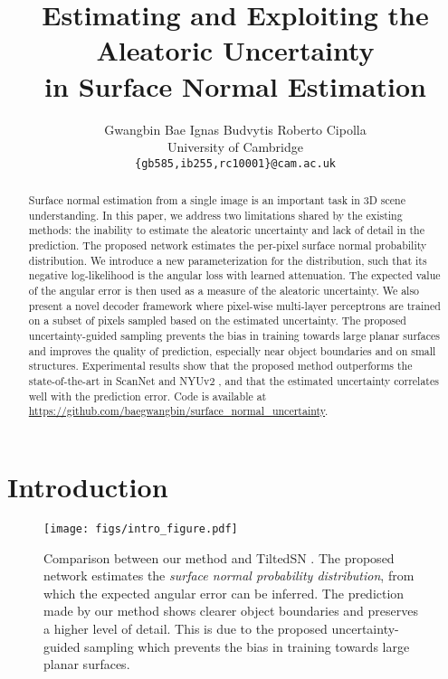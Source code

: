 \documentclass[10pt,twocolumn,letterpaper]{article}
\begin{document}
\title{Estimating and Exploiting the Aleatoric Uncertainty \\ in Surface Normal Estimation}

\author{Gwangbin Bae \;\;\;\; Ignas Budvytis \;\;\;\; Roberto Cipolla\\
University of Cambridge\\
{\tt\small \{gb585,ib255,rc10001\}@cam.ac.uk}
}

\maketitle
\ificcvfinal\thispagestyle{empty}\fi

\begin{abstract}
Surface normal estimation from a single image is an important task in 3D scene understanding. In this paper, we address two limitations shared by the existing methods: the inability to estimate the aleatoric uncertainty and lack of detail in the prediction. The proposed network estimates the per-pixel surface normal probability distribution. We introduce a new parameterization for the distribution, such that its negative log-likelihood is the angular loss with learned attenuation. The expected value of the angular error is then used as a measure of the aleatoric uncertainty. We also present a novel decoder framework where pixel-wise multi-layer perceptrons are trained on a subset of pixels sampled based on the estimated uncertainty. The proposed uncertainty-guided sampling prevents the bias in training towards large planar surfaces and improves the quality of prediction, especially near object boundaries and on small structures. Experimental results show that the proposed method outperforms the state-of-the-art in ScanNet \cite{ScanNet} and NYUv2 \cite{NYUv2}, and that the estimated uncertainty correlates well with the prediction error. Code is available at \url{https://github.com/baegwangbin/surface_normal_uncertainty}.
\end{abstract}

\section{Introduction}
\label{sec:intro}

\begin{figure}[t]
\begin{center}
\texttt{[image: figs/intro\_figure.pdf]}
\end{center}
\caption{Comparison between our method and TiltedSN \cite{SNfromRGB_20_TiltedSN}. The proposed network estimates the \textit{surface normal probability distribution}, from which the expected angular error can be inferred. The prediction made by our method shows clearer object boundaries and preserves a higher level of detail. This is due to the proposed uncertainty-guided sampling which prevents the bias in training towards large planar surfaces.}
\label{fig:intro}
\end{figure}
\end{document}
